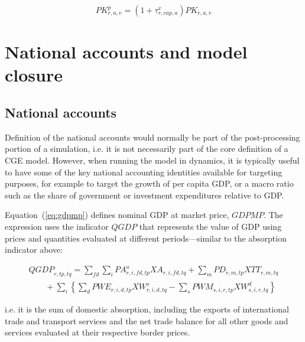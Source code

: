 \documentclass[11pt,letterpaper]{report}
\begin{document}
\begin{equation}
\label{eq:pkp}
\mathit{PK}^p_{r,a,v} =
   \left( 1 + \tau^v_{r,\mathit{cap},a} \right) \mathit{PK}_{r,a,v}
\end{equation}

\section{National accounts and model closure}
\renewcommand{\theequation}{{M-}\arabic{equation}}
\setcounter{equation}{0}

\subsection{National accounts}

Definition of the national accounts would normally be part of the
post-processing portion of a simulation, i.e. it is not necessarily part of the
core definition of a CGE model. However, when running the model in dynamics, it
is typically useful to have some of the key national accounting identities
available for targeting purposes, for example to target the growth of per capita
GDP, or a macro ratio such as the share of government or investment expenditures
relative to GDP.

Equation~(\ref{eq:gdpmp}) defines nominal GDP at market price, $\mathit{GDPMP}$.
The expression uses the indicator $\mathit{QGDP}$ that represents the value of
GDP using prices and quantities evaluated at different periods---similar to the
absorption indicator above:

\[
\begin{array}{*{20}{l}}
\displaystyle \mathit{QGDP}_{r,\mathit{tp},\mathit{tq}} =
   \sum_{\mathit{fd}} { \sum_i{
      \mathit{PA}^a_{r,i,\mathit{fd},\mathit{tp}}
      \mathit{XA}_{r,i,\mathit{fd},\mathit{tq}}
   }}
+  \sum_m {
      \mathit{PD_{r,m,\mathit{tp}}} \mathit{XTT_{r,m,\mathit{tq}}}
   } \\
\qquad + \displaystyle
   \sum_i {
      \left\{\sum_d {
         \mathit{PWE_{r,i,d,\mathit{tp}}} \mathit{XW}^s_{r,i,d,\mathit{tq}}
      }
      - \sum_s {
         \mathit{PWM_{s,i,r,\mathit{tp}}} \mathit{XW}^d_{s,i,r,\mathit{tq}}
      }
      \right\}}
\end{array}
\]

\noindent i.e. it is the sum of domestic absorption, including the exports of
international trade and transport services and the net trade balance for all
other goods and services evaluated at their respective border prices.
\end{document}
